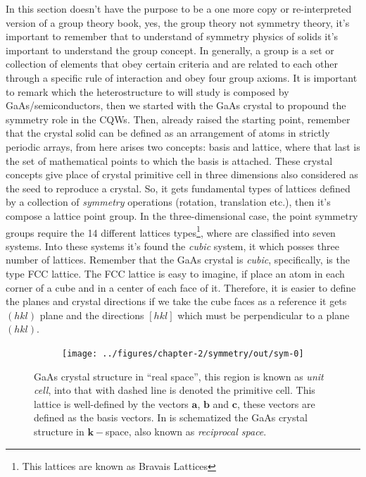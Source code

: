 In this section doesn't have the purpose to be a one more copy or re-interpreted version of a group theory book, yes,  the group theory not symmetry theory, it's important to remember that to understand of symmetry physics of solids it's important to understand the group concept. 
In generally, a group is a set or collection of elements that obey certain criteria and are related to each other through a specific rule of interaction and obey four group axioms\cite{powell2010symmetry,cornwell1997group,muller2013symmetry}. 
It is important to remark which the heterostructure to will study is composed by GaAs/\algaas semiconductors, then  we started with the GaAs crystal to propound the symmetry role in the  CQWs.  Then, already raised the starting point,  remember that the crystal solid  can be defined as an  arrangement of atoms in strictly periodic arrays\cite{kittel2018kittel,solyom2007fundamentals}, from here arises two concepts: basis and lattice, where that last is the set of mathematical points to which the basis is attached\cite{kittel2018kittel}. These crystal concepts give place of crystal primitive cell in three dimensions also considered as the seed to reproduce a crystal. So, it gets  fundamental types of lattices defined  by a collection of \emph{symmetry} operations (rotation, translation etc.), then it's compose a lattice point group. In the three-dimensional case, the point symmetry groups require the 14 different lattices types\footnote{This lattices are known as Bravais Lattices}, where are classified into seven systems. Into these systems it's found the \emph{cubic} system, it which posses three number of lattices. Remember that the GaAs crystal is \emph{cubic},  specifically, is the type FCC lattice.  The FCC lattice is easy to imagine, if place an atom in each corner of  a cube and in a center of each face of it. Therefore, it is easier  to define  the planes and crystal directions if we take the cube faces as a reference it gets $(hkl)$ plane and the directions $\left[hkl\right]$ which must be perpendicular to a plane $(hkl)$\cite{kittel2018kittel}. 
\begin{figure}[h!]
	\centering
	\begin{subfigure}{\textwidth}
		\texttt{[image: ../figures/chapter-2/symmetry/out/sym-0]}
		\label{subfig:subsubsection-2.1-crystal-rspace-a)}
		\label{subfig:subsubsection-2.1-crystal-kspace-b)}
	\end{subfigure}
	\caption{ GaAs crystal structure in ``real space'',  this region is known as \emph{unit cell}, into that with dashed line is denoted the primitive cell. This lattice is well-defined by the vectors $\mathbf{a}$, $\mathbf{b}$ and $\mathbf{c}$, these vectors are defined as the basis vectors.  In  is schematized the GaAs crystal structure in $\boldsymbol{k}-$space, also known as \emph{reciprocal space}.}
	\label{fig:subsubsection-2.1-crystal-r-k-space}
\end{figure}

